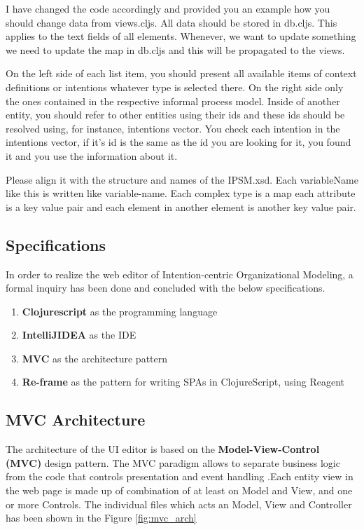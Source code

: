 I have changed the code accordingly and provided you an example how you should change data from views.cljs. All data should be stored in db.cljs. This applies to the text fields of all elements. Whenever, we want to update something we need to update the map in db.cljs and this will be propagated to the views.


On the left side of each list item, you should present all available items of context definitions or intentions whatever type is selected there. On the right side only the ones contained in the respective informal process model. Inside of another entity, you should refer to other entities using their ids and these ids should be resolved using, for instance, intentions vector. You check each intention in the intentions vector, if it’s id is the same as the id you are looking for it, you found it and you use the information about it.  


Please align it with the structure and names of the IPSM.xsd. Each variableName like this is written like variable-name. Each complex type is a map each attribute is a key value pair and each element in another element is another key value pair.


\subsection{Specifications}
\label{subsec:specifications}
In order to realize the web editor of Intention-centric Organizational Modeling, a formal inquiry has been done and concluded with the below specifications.

\begin{enumerate}   
	\item \textbf{Clojurescript} as the programming language
	\item \textbf{IntelliJIDEA} as the IDE
	\item \textbf{MVC} as the architecture pattern
	\item \textbf{Re-frame} as the pattern for writing SPAs in ClojureScript, using Reagent	
\end{enumerate}

\subsection{MVC Architecture}
\label{subsec:mvcarch}
 The architecture of the UI editor is based on the \textbf{Model-View-Control (MVC)} design pattern. The MVC paradigm allows to separate business logic from the code that controls presentation and event handling \cite{Oracle2016}.Each entity view in the web page is made up of combination of at least on Model and View, and one or more Controls. The individual files which acts an Model, View and Controller has been shown in the Figure \ref{fig:mvc_arch}


